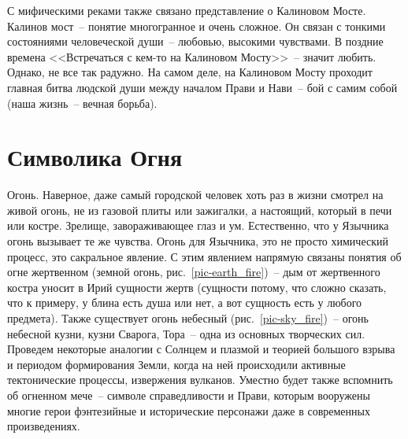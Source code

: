 \documentclass[pscyr,chapters]{hedwork}
\begin{document}
  С мифическими реками также связано представление о Калиновом Мосте. Калинов
  мост~-- понятие многогранное и очень сложное. Он связан с тонкими состояниями
  человеческой души~-- любовью, высокими чувствами. В поздние времена
  <<Встречаться с кем-то на Калиновом Мосту>>~-- значит любить. Однако, не все
  так радужно. На самом деле, на Калиновом Мосту проходит главная битва людской
  души между началом Прави и Нави~-- бой с самим собой (наша жизнь~-- вечная
  борьба).

  \chapter{Символика Огня}
  
  Огонь. Наверное, даже самый городской человек хоть раз в жизни смотрел на
  живой огонь, не из газовой плиты или зажигалки, а настоящий, который в печи
  или костре. Зрелище, завораживающее глаз и ум. Естественно, что у Язычника
  огонь вызывает те же чувства. Огонь для Язычника, это не просто химический
  процесс, это сакральное явление. С этим явлением напрямую связаны понятия об
  огне жертвенном (земной огонь, рис.~\ref{pic-earth_fire})~-- дым от
  жертвенного костра уносит в Ирий сущности жертв (сущности потому, что сложно
  сказать, что к примеру, у блина есть душа или нет, а вот сущность есть у
  любого предмета). Также существует огонь небесный (рис.~\ref{pic-sky_fire})~--
  огонь небесной кузни, кузни Сварога, Тора~-- одна из основных творческих сил.
  Проведем некоторые аналогии с Солнцем и плазмой и теорией большого взрыва и
  периодом формирования Земли, когда на ней происходили активные тектонические
  процессы, извержения вулканов. Уместно будет также вспомнить об огненном
  мече~-- символе справедливости и Прави, которым вооружены многие герои
  фэнтезийные и исторические персонажи даже в современных произведениях.
\end{document}

